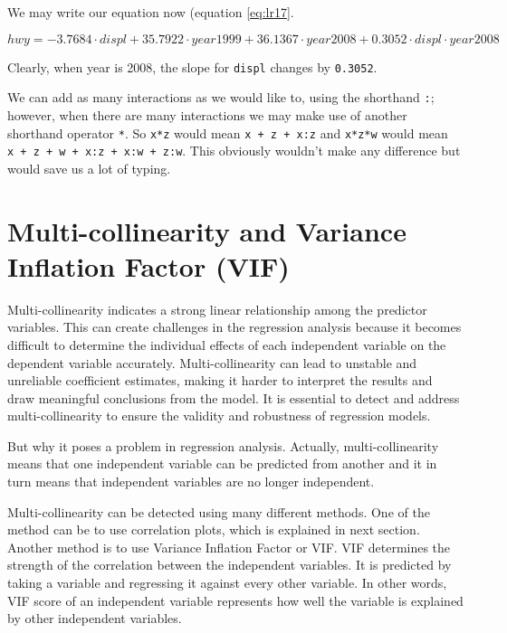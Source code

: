 \documentclass[
]{book}
\begin{document}
We may write our equation now (equation \eqref{eq:lr17}.

\begin{equation} 
{hwy} = -3.7684\cdot{displ} + 35.7922\cdot{year1999} + 36.1367\cdot{year2008} + 0.3052\cdot{displ}\cdot{year2008}
\label{eq:lr17}
\end{equation}

Clearly, when year is 2008, the slope for \texttt{displ} changes by \texttt{0.3052}.

We can add as many interactions as we would like to, using the shorthand \texttt{:}; however, when there are many interactions we may make use of another shorthand operator \texttt{*}. So \texttt{x*z} would mean \texttt{x\ +\ z\ +\ x:z} and \texttt{x*z*w} would mean \texttt{x\ +\ z\ +\ w\ +\ x:z\ +\ x:w\ +\ z:w}. This obviously wouldn't make any difference but would save us a lot of typing.

\hypertarget{multi-collinearity-and-variance-inflation-factor-vif}{%
\section{Multi-collinearity and Variance Inflation Factor (VIF)}\label{multi-collinearity-and-variance-inflation-factor-vif}}

Multi-collinearity indicates a strong linear relationship among the predictor variables. This can create challenges in the regression analysis because it becomes difficult to determine the individual effects of each independent variable on the dependent variable accurately. Multi-collinearity can lead to unstable and unreliable coefficient estimates, making it harder to interpret the results and draw meaningful conclusions from the model. It is essential to detect and address multi-collinearity to ensure the validity and robustness of regression models.

But why it poses a problem in regression analysis. Actually, multi-collinearity means that one independent variable can be predicted from another and it in turn means that independent variables are no longer independent.

Multi-collinearity can be detected using many different methods. One of the method can be to use correlation plots, which is explained in next section. Another method is to use Variance Inflation Factor or VIF. VIF determines the strength of the correlation between the independent variables. It is predicted by taking a variable and regressing it against every other variable. In other words, VIF score of an independent variable represents how well the variable is explained by other independent variables.
\end{document}
